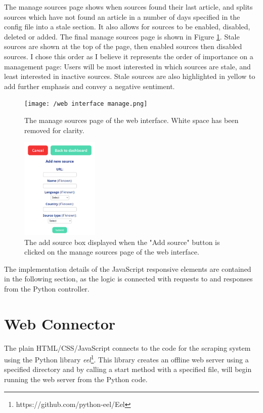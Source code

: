 \documentclass{l4proj}
\begin{document}
The manage sources page shows when sources found their last article, and splits sources which have not found an article in a number of days specified in the config file into a stale section. It also allows for sources to be enabled, disabled, deleted or added. The final manage sources page is shown in Figure \ref{fig:web-interface-manage}. Stale sources are shown at the top of the page, then enabled sources then disabled sources. I chose this order as I believe it represents the order of importance on a management page: Users will be most interested in which sources are stale, and least interested in inactive sources. Stale sources are also highlighted in yellow to add further emphasis and convey a negative sentiment. 

\begin{figure}[!ht]
\centering
\texttt{[image: /web interface manage.png]}
\caption{The manage sources page of the web interface. White space has been removed for clarity.}
\label{fig:web-interface-manage}
\end{figure}

\begin{figure}[!ht]
\centering
\includegraphics[width=0.33\textwidth]{images/add-source-box.png}
\caption{The add source box displayed when the "Add source" button is clicked on the manage sources page of the web interface.}
\label{fig:add-sources-box}
\end{figure}

The implementation details of the JavaScript responsive elements are contained in the following section, as the logic is connected with requests to and responses from the Python controller.

\section{Web Connector}
The plain HTML/CSS/JavaScript connects to the code for the scraping system using the Python library \emph{eel}\footnote{https://github.com/python-eel/Eel}. This library creates an offline web server using a specified directory and by calling a start method with a specified file, will begin running the web server from the Python code.
\end{document}

